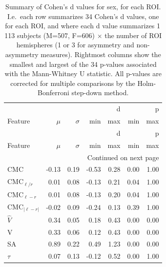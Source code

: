 \documentclass{article}
\begin{document}
\begin{longtable}{lrrrrrr}
	\caption{Summary of Cohen's d values for sex, for each ROI\@. I.e.\ each row summarizes 34 Cohen's d values, one for each ROI, and where each d value summarizes 1\,113 subjects (M=507, F=606) $\times$ the number of ROI hemispheres (1 or 3 for asymmetry and non-asymmetry measures). Rightmost columns show the smallest and largest of the 34 p-values associated with the Mann-Whitney U statistic. All p-values are corrected for multiple comparisons by the Holm-Bonferroni step-down method.} \label{tab:sex-roi-ds} \\
	\toprule
	 & \multicolumn{4}{r}{d} & \multicolumn{2}{r}{p} \\
	Feature & $\mu$ & $\sigma$ & min & max & min & max \\
	\midrule
	\endfirsthead
	\toprule
	 & \multicolumn{4}{r}{d} & \multicolumn{2}{r}{p} \\
	Feature & $\mu$ & $\sigma$ & min & max & min & max \\
	\midrule
	\endhead
	\midrule
	\multicolumn{7}{r}{Continued on next page} \\
	\midrule
	\endfoot
	\bottomrule
	\endlastfoot
	$\text{CMC}$ & -0.13 & 0.19 & -0.53 & 0.28 & 0.00 & 1.00 \\*
	$\text{CMC}_{\ell / r}$ & 0.01 & 0.08 & -0.13 & 0.21 & 0.04 & 1.00 \\*
	$\text{CMC}_{\ell - r}$ & 0.01 & 0.08 & -0.13 & 0.20 & 0.04 & 1.00 \\*
	$\text{CMC}_{|\ell - r|}$ & -0.02 & 0.09 & -0.24 & 0.13 & 0.39 & 1.00 \\*
	$\hat{V}$ & 0.34 & 0.05 & 0.18 & 0.43 & 0.00 & 0.00 \\*
	V & 0.33 & 0.06 & 0.12 & 0.43 & 0.00 & 0.00 \\*
	SA & 0.89 & 0.22 & 0.49 & 1.23 & 0.00 & 0.00 \\*
	$\tau$ & 0.07 & 0.13 & -0.12 & 0.52 & 0.00 & 1.00 \\*
\end{longtable}
\end{document}
